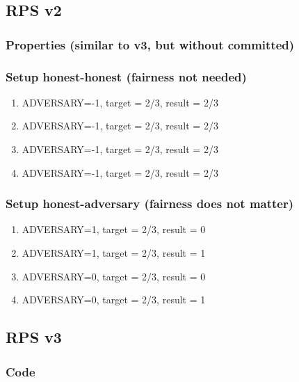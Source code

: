 \documentclass{article}
\begin{document}
\subsection{RPS v2}



\subsubsection{Properties (similar to v3, but without committed)}



\subsubsection{Setup honest-honest (fairness not needed)}

\begin{enumerate}
\item ADVERSARY=-1, target = 2/3, result = 2/3
\item ADVERSARY=-1, target = 2/3, result = 2/3
\item ADVERSARY=-1, target = 2/3, result = 2/3
\item ADVERSARY=-1, target = 2/3, result = 2/3
\end{enumerate}

\subsubsection{Setup honest-adversary (fairness does not matter)}

\begin{enumerate}
\item ADVERSARY=1, target = 2/3, result = 0
\item ADVERSARY=1, target = 2/3, result = 1
\item ADVERSARY=0, target = 2/3, result = 0
\item ADVERSARY=0, target = 2/3, result = 1
\end{enumerate}

\subsection{RPS v3}

\subsubsection{Code}
\end{document}
